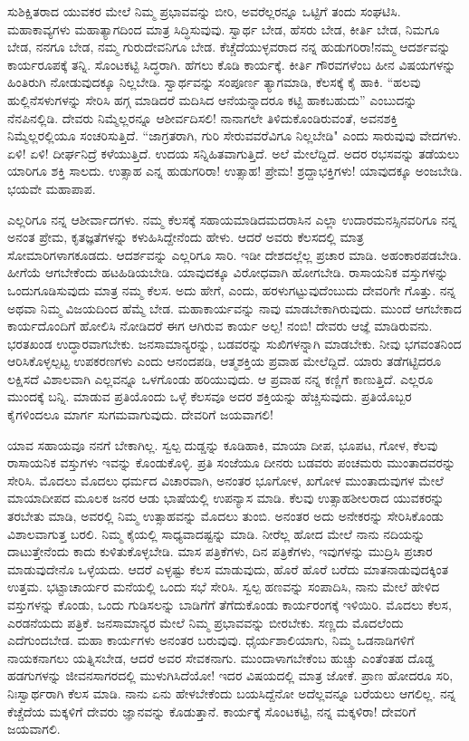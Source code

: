 ಸುಶಿಕ್ಷಿತರಾದ ಯುವಕರ ಮೇಲೆ ನಿಮ್ಮ ಪ್ರಭಾವವನ್ನು ಬೀರಿ, ಅವರೆಲ್ಲರನ್ನೂ ಒಟ್ಟಿಗೆ ತಂದು ಸಂಘಟಿಸಿ. ಮಹಾಕಾವ್ಯಗಳು ಮಹಾತ್ಯಾಗದಿಂದ ಮಾತ್ರ ಸಿದ್ಧಿಸುವುವು. ಸ್ವಾರ್ಥ ಬೇಡ, ಹೆಸರು ಬೇಡ, ಕೀರ್ತಿ ಬೇಡ, ನಿಮಗೂ ಬೇಡ, ನನಗೂ ಬೇಡ, ನಮ್ಮ ಗುರುದೇವನಿಗೂ ಬೇಡ. ಕೆಚ್ಚೆದೆಯುಳ್ಳವರಾದ ನನ್ನ ಹುಡುಗರಿರಾ!ನಮ್ಮ ಆದರ್ಶವನ್ನು ಕಾರ್ಯರೂಪಕ್ಕೆ ತನ್ನಿ. ಸೊಂಟಕಟ್ಟಿ ಸಿದ್ಧರಾಗಿ. ಹೆಗಲು ಕೊಡಿ ಕಾರ್ಯಕ್ಕೆ. ಕೀರ್ತಿ ಗೌರವಗಳೆಂಬ ಹೀನ ವಿಷಯಗಳನ್ನು ಹಿಂತಿರುಗಿ ನೋಡುವುದಕ್ಕೂ ನಿಲ್ಲಬೇಡಿ. ಸ್ವಾರ್ಥವನ್ನು ಸಂಪೂರ್ಣ ತ್ಯಾಗಮಾಡಿ, ಕೆಲಸಕ್ಕೆ ಕೈ ಹಾಕಿ. ``ಹಲವು ಹುಲ್ಲಿನೆಸಳುಗಳನ್ನು ಸೇರಿಸಿ ಹಗ್ಗ ಮಾಡಿದರೆ ಮದಿಸಿದ ಆನೆಯನ್ನಾದರೂ ಕಟ್ಟಿ ಹಾಕಬಹುದು'' ಎಂಬುದನ್ನು ನೆನಪಿನಲ್ಲಿಡಿ. ದೇವರು ನಿಮ್ಮೆಲ್ಲರನ್ನೂ ಆಶೀರ್ವದಿಸಲಿ! ನಾನಾಗಲೇ ತಿಳಿದುಕೊಂಡಿರುವಂತೆ, ಅವನಶಕ್ತಿ ನಿಮ್ಮೆಲ್ಲರಲ್ಲಿಯೂ ಸಂಚರಿಸುತ್ತಿದೆ. ``ಜಾಗ್ರತರಾಗಿ, ಗುರಿ ಸೇರುವವರೆವಿಗೂ ನಿಲ್ಲಬೇಡಿ" ಎಂದು ಸಾರುವುವು ವೇದಗಳು. ಏಳಿ! ಏಳಿ! ದೀರ್ಘನಿದ್ರೆ ಕಳೆಯುತ್ತಿದೆ. ಉದಯ ಸನ್ನಿಹಿತವಾಗುತ್ತಿದೆ. ಅಲೆ ಮೇಲೆದ್ದಿದೆ. ಅದರ ರಭಸವನ್ನು ತಡೆಯಲು ಯಾರಿಗೂ ಶಕ್ತಿ ಸಾಲದು. ಉತ್ಸಾಹ ಎನ್ನ ಹುಡುಗರಿರಾ! ಉತ್ಸಾಹ! ಪ್ರೇಮ! ಶ್ರದ್ದಾಭಕ್ತಿಗಳು! ಯಾವುದಕ್ಕೂ ಅಂಜಬೇಡಿ. ಭಯವೇ ಮಹಾಪಾಪ.

ಎಲ್ಲರಿಗೂ ನನ್ನ ಆಶೀರ್ವಾದಗಳು. ನಮ್ಮ ಕೆಲಸಕ್ಕೆ ಸಹಾಯಮಾಡಿದಮದರಾಸಿನ ಎಲ್ಲಾ ಉದಾರಮನಸ್ಸಿನವರಿಗೂ ನನ್ನ ಅನಂತ ಪ್ರೇಮ, ಕೃತಜ್ಞತೆಗಳನ್ನು ಕಳುಹಿಸಿದ್ದೇನೆಂದು ಹೇಳು. ಆದರೆ ಅವರು ಕೆಲಸದಲ್ಲಿ ಮಾತ್ರ ಸೋಮಾರಿಗಳಾಗಕೂಡದು. ಆದರ್ಶವನ್ನು ಎಲ್ಲರಿಗೂ ಸಾರಿ. ಇಡೀ ದೇಶದಲ್ಲೆಲ್ಲ ಪ್ರಚಾರ ಮಾಡಿ. ಅಹಂಕಾರಪಡಬೇಡಿ. ಹೀಗೆಯೆ ಆಗಬೇಕೆಂದು ಹಟಹಿಡಿಯಬೇಡಿ. ಯಾವುದಕ್ಕೂ ವಿರೋಧವಾಗಿ ಹೋಗಬೇಡಿ. ರಾಸಾಯನಿಕ ವಸ್ತುಗಳನ್ನು ಒಂದುಗೂಡಿಸುವುದು ಮಾತ್ರ ನಮ್ಮ ಕೆಲಸ. ಅದು ಹೇಗೆ, ಎಂದು, ಹರಳುಗಟ್ಟುವುದೆಂಬುದು ದೇವರಿಗೇ ಗೊತ್ತು. ನನ್ನ ಅಥವಾ ನಿಮ್ಮ ವಿಜಯದಿಂದ ಹೆಮ್ಮೆ ಬೇಡ. ಮಹಾಕಾರ್ಯವನ್ನು ನಾವು ಮಾಡಬೇಕಾಗಿರುವುದು. ಮುಂದೆ ಆಗಬೇಕಾದ ಕಾರ್ಯದೊಂದಿಗೆ ಹೋಲಿಸಿ ನೋಡಿದರೆ ಈಗ ಆಗಿರುವ ಕಾರ್ಯ ಅಲ್ಪ! ನಂಬಿ! ದೇವರು ಆಜ್ಞೆ ಮಾಡಿರುವನು. ಭರತಖಂಡ ಉದ್ಧಾರವಾಗಬೇಕು. ಜನಸಾಮಾನ್ಯರನ್ನು, ಬಡವರನ್ನು ಸುಖಿಗಳನ್ನಾಗಿ ಮಾಡಬೇಕು. ನೀವು ಭಗವಂತನಿಂದ ಆರಿಸಿಕೊಳ್ಳಲ್ಪಟ್ಟ ಉಪಕರಣಗಳು ಎಂದು ಆನಂದಪಡಿ, ಆತ್ಮಶಕ್ತಿಯ ಪ್ರವಾಹ ಮೇಲೆದ್ದಿದೆ. ಯಾರು ತಡೆಗಟ್ಟಿದರೂ ಲಕ್ಷಿಸದೆ ವಿಶಾಲವಾಗಿ ಎಲ್ಲವನ್ನೂ ಒಳಗೊಂಡು ಹರಿಯುವುದು. ಆ ಪ್ರವಾಹ ನನ್ನ ಕಣ್ಣಿಗೆ ಕಾಣುತ್ತಿದೆ. ಎಲ್ಲರೂ ಮುಂದಕ್ಕೆ ಬನ್ನಿ. ಮಾಡುವ ಪ್ರತಿಯೊಂದು ಒಳ್ಳೆ ಕೆಲಸವೂ ಅದರ ಶಕ್ತಿಯನ್ನು ಹೆಚ್ಚಿಸುವುದು. ಪ್ರತಿಯೊಬ್ಬರ ಕೈಗಳಿಂದಲೂ ಮಾರ್ಗ ಸುಗಮವಾಗುವುದು. ದೇವರಿಗೆ ಜಯವಾಗಲಿ!

ಯಾವ ಸಹಾಯವೂ ನನಗೆ ಬೇಕಾಗಿಲ್ಲ. ಸ್ವಲ್ಪ ದುಡ್ಡನ್ನು ಕೂಡಿಹಾಕಿ, ಮಾಯಾ ದೀಪ, ಭೂಪಟ, ಗೋಳ, ಕೆಲವು ರಾಸಾಯನಿಕ ವಸ್ತುಗಳು ಇವನ್ನು ಕೊಂಡುಕೊಳ್ಳಿ. ಪ್ರತಿ ಸಂಜೆಯೂ ದೀನರು ಬಡವರು ಪಂಚಮರು ಮುಂತಾದವರನ್ನು ಸೇರಿಸಿ. ಮೊದಲು ಮೊದಲು ಧರ್ಮದ ವಿಚಾರವಾಗಿ, ಅನಂತರ ಭೂಗೋಳ, ಖಗೋಳ ಮುಂತಾದುವುಗಳ ಮೇಲೆ ಮಾಯಾದೀಪದ ಮೂಲಕ ಜನರ ಆಡು ಭಾಷೆಯಲ್ಲಿ ಉಪನ್ಯಾಸ ಮಾಡಿ. ಕೆಲವು ಉತ್ಸಾಹಶೀಲರಾದ ಯುವಕರನ್ನು ತರಬೇತು ಮಾಡಿ, ಅವರಲ್ಲಿ ನಿಮ್ಮ ಉತ್ಸಾಹವನ್ನು ಮೊದಲು ತುಂಬಿ. ಅನಂತರ ಅದು ಅನೇಕರನ್ನು ಸೇರಿಸಿಕೊಂಡು ವಿಶಾಲವಾಗುತ್ತ ಬರಲಿ. ನಿಮ್ಮ ಕೈಯಲ್ಲಿ ಸಾಧ್ಯವಾದಷ್ಟನ್ನು ಮಾಡಿ. ನೀರೆಲ್ಲ ಹೋದ ಮೇಲೆ ನಾನು ನದಿಯನ್ನು ದಾಟುತ್ತೇನೆಂದು ಕಾದು ಕುಳಿತುಕೊಳ್ಳಬೇಡಿ. ಮಾಸ ಪತ್ರಿಕೆಗಳು, ದಿನ ಪತ್ರಿಕೆಗಳು, ಇವುಗಳನ್ನು ಮುದ್ರಿಸಿ ಪ್ರಚಾರ ಮಾಡುವುದೇನೊ ಒಳ್ಳೆಯದು. ಆದರೆ ಎಳ್ಳಷ್ಟು ಕೆಲಸ ಮಾಡುವುದು, ಹೊರೆ ಹೊರೆ ಬರೆದು ಮಾತನಾಡುವುದಕ್ಕಿಂತ ಉತ್ತಮ. ಭಟ್ಟಾಚಾರ್ಯರ ಮನೆಯಲ್ಲಿ ಒಂದು ಸಭೆ ಸೇರಿಸಿ. ಸ್ವಲ್ಪ ಹಣವನ್ನು ಸಂಪಾದಿಸಿ, ನಾನು ಮೇಲೆ ಹೇಳಿದ ವಸ್ತುಗಳನ್ನು ಕೊಂಡು, ಒಂದು ಗುಡಿಸಲನ್ನು ಬಾಡಿಗೆಗೆ ತೆಗೆದುಕೊಂಡು ಕಾರ್ಯರಂಗಕ್ಕೆ ಇಳಿಯಿರಿ. ಮೊದಲು ಕೆಲಸ, ಎರಡನೆಯದು ಪತ್ರಿಕೆ. ಜನಸಾಮಾನ್ಯರ ಮೇಲೆ ನಿಮ್ಮ ಪ್ರಭಾವವನ್ನು ಬೀರಬೇಕು. ಸಣ್ಣದು ಮೊದಲೆಂದು ಎದೆಗುಂದಬೇಡ. ಮಹಾ ಕಾರ್ಯಗಳು ಅನಂತರ ಬರುವುವು. ಧೈರ್ಯಶಾಲಿಯಾಗು, ನಿಮ್ಮ ಒಡನಾಡಿಗಳಿಗೆ ನಾಯಕನಾಗಲು ಯತ್ನಿಸಬೇಡ, ಆದರೆ ಅವರ ಸೇವಕನಾಗು. ಮುಂದಾಳಾಗಬೇಕೆಂಬ ಹುಚ್ಚು ಎಂತೆಂತಹ ದೊಡ್ಡ ಹಡಗುಗಳನ್ನು ಜೀವನಸಾಗರದಲ್ಲಿ ಮುಳುಗಿಸಿದೆಯೋ! ಇದರ ವಿಷಯದಲ್ಲಿ ಮಾತ್ರ ಜೋಕೆ. ಪ್ರಾಣ ಹೋದರೂ ಸರಿ, ನಿಃಸ್ವಾರ್ಥರಾಗಿ ಕೆಲಸ ಮಾಡಿ. ನಾನು ಏನು ಹೇಳಬೇಕೆಂದು ಬಯಸಿದ್ದೆನೋ ಅದೆಲ್ಲವನ್ನೂ ಬರೆಯಲು ಆಗಲಿಲ್ಲ. ನನ್ನ ಕೆಚ್ಚೆದೆಯ ಮಕ್ಕಳಿಗೆ ದೇವರು ಜ್ಞಾನವನ್ನು ಕೊಡುತ್ತಾನೆ. ಕಾರ್ಯಕ್ಕೆ ಸೊಂಟಕಟ್ಟಿ, ನನ್ನ ಮಕ್ಕಳಿರಾ! ದೇವರಿಗೆ ಜಯವಾಗಲಿ.

